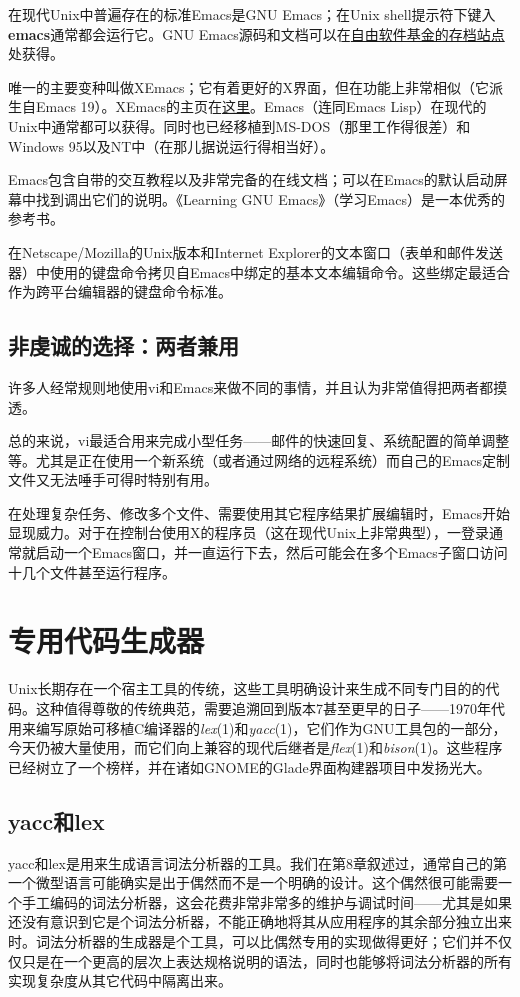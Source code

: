 \documentclass[12pt,oneside]{book}
\begin{document}
在现代Unix中普遍存在的标准Emacs是GNU Emacs；在Unix shell提示符下键入\textbf{emacs}通常都会运行它。GNU Emacs源码和文档可以在\href{ftp://gnu.org/pub/gnu}{自由软件基金的存档站点}处获得。

唯一的主要变种叫做XEmacs；它有着更好的X界面，但在功能上非常相似（它派生自Emacs 19）。XEmacs的主页在\href{http://www.xemacs.org/}{这里}。Emacs（连同Emacs Lisp）在现代的Unix中通常都可以获得。同时也已经移植到MS-DOS（那里工作得很差）和Windows 95以及NT中（在那儿据说运行得相当好）。

Emacs包含自带的交互教程以及非常完备的在线文档；可以在Emacs的默认启动屏幕中找到调出它们的说明。《Learning GNU Emacs》（学习Emacs）\cite{Cameron}是一本优秀的参考书。

在Netscape/Mozilla的Unix版本和Internet Explorer的文本窗口（表单和邮件发送器）中使用的键盘命令拷贝自Emacs中绑定的基本文本编辑命令。这些绑定最适合作为跨平台编辑器的键盘命令标准。

\subsection{非虔诚的选择：两者兼用}
许多人经常规则地使用vi和Emacs来做不同的事情，并且认为非常值得把两者都摸透。

总的来说，vi最适合用来完成小型任务——邮件的快速回复、系统配置的简单调整等。尤其是正在使用一个新系统（或者通过网络的远程系统）而自己的Emacs定制文件又无法唾手可得时特别有用。

在处理复杂任务、修改多个文件、需要使用其它程序结果扩展编辑时，Emacs开始显现威力。对于在控制台使用X的程序员（这在现代Unix上非常典型），一登录通常就启动一个Emacs窗口，并一直运行下去，然后可能会在多个Emacs子窗口访问十几个文件甚至运行程序。

\section{专用代码生成器}
Unix长期存在一个宿主工具的传统，这些工具明确设计来生成不同专门目的的代码。这种值得尊敬的传统典范，需要追溯回到版本7甚至更早的日子——1970年代用来编写原始可移植C编译器的\textit{lex}(1)和\textit{yacc}(1)，它们作为GNU工具包的一部分，今天仍被大量使用，而它们向上兼容的现代后继者是\textit{flex}(1)和\textit{bison}(1)。这些程序已经树立了一个榜样，并在诸如GNOME的Glade界面构建器项目中发扬光大。


\subsection{yacc和lex}
yacc和lex是用来生成语言词法分析器的工具。我们在第8章叙述过，通常自己的第一个微型语言可能确实是出于偶然而不是一个明确的设计。这个偶然很可能需要一个手工编码的词法分析器，这会花费非常非常多的维护与调试时间——尤其是如果还没有意识到它是个词法分析器，不能正确地将其从应用程序的其余部分独立出来时。词法分析器的生成器是个工具，可以比偶然专用的实现做得更好；它们并不仅仅只是在一个更高的层次上表达规格说明的语法，同时也能够将词法分析器的所有实现复杂度从其它代码中隔离出来。
\end{document}
